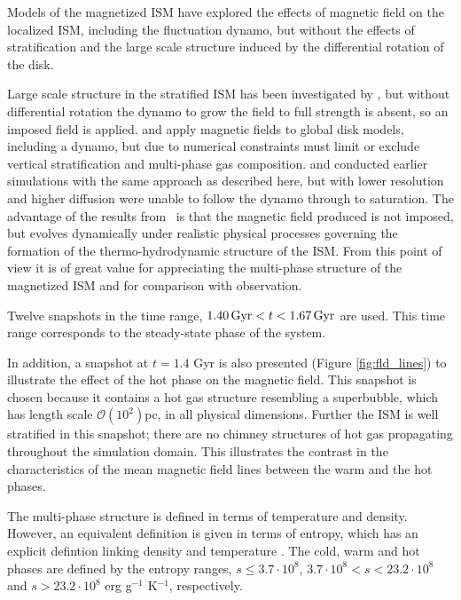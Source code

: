 \documentclass[useAMS,usenatbib]{mn2e}
\begin{document}
Models of the magnetized ISM \citep{Heitsch01,M-LBKA05} 
have explored the effects of magnetic field on the localized ISM, including the fluctuation dynamo, but without the effects of stratification and the large scale structure induced by the differential rotation of the disk.

Large scale structure in the stratified ISM has been investigated by
\citet{AB05a}, but without differential rotation the dynamo to grow the field to full strength is absent, so an imposed field is applied. 
\citet{Hanasz05,Dobbs08} and \citet{Hanasz09} apply magnetic fields to global disk models, including a dynamo, but due to numerical constraints must limit or exclude vertical stratification and multi-phase gas composition.
\citet{Korpi99a} and \cite{Gressel08} conducted earlier simulations with the same approach as described here, but with lower resolution and higher 
diffusion were unable to follow the dynamo through to saturation.
The advantage of the results from \MHD\ is that the magnetic field produced is not imposed, but evolves dynamically under realistic physical processes governing the formation of the thermo-hydrodynamic structure of the ISM.
From this point of view it is of great value for appreciating the multi-phase structure of the magnetized ISM and for comparison with observation.

Twelve snapshots in the time range, $1.40\,{\rm Gyr}<t<1.67\,{\rm Gyr}$ are used. 
This time range corresponds to the steady-state phase of the system. 
 
In addition, a snapshot at $t=1.4$ Gyr is also presented (Figure \ref{fig:fld_lines}) to illustrate the effect of the hot phase on the magnetic field. This snapshot is chosen because it contains a hot gas structure resembling a superbubble, which has length scale $\mathcal O(10^2)$pc, in all physical dimensions. Further the ISM is well stratified in this snapshot; there are no chimney structures of hot gas propagating throughout the simulation domain. This illustrates the contrast in the characteristics of the mean magnetic field lines between the warm and the hot phases.   

The multi-phase structure is defined in terms of temperature and density. However, an equivalent definition is given in terms of entropy, which has an explicit defintion linking density and temperature \citep{Gent12}. The cold, warm and hot phases are defined by the entropy ranges, $s\leq3.7\cdot10^8$, $3.7\cdot10^8<s<23.2\cdot10^8$ and $s>23.2\cdot10^8$ erg g$^{-1}$ K$^{-1}$, respectively. 
\end{document}
